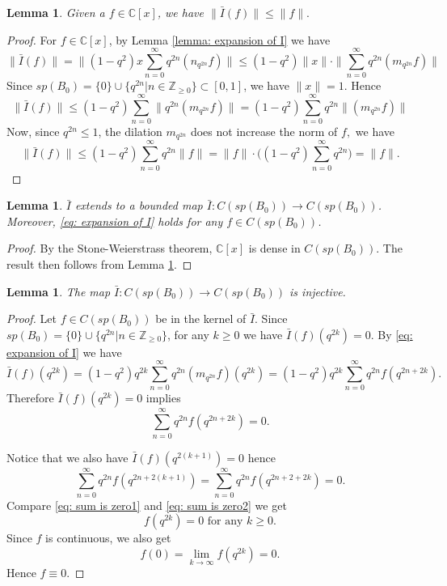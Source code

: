 \documentclass[12pt]{article}
\newtheorem{lemma}[definition]{Lemma}
\numberwithin{equation}{section}
\def\Z{{\mathbb Z}}
\def\C{{\mathbb C}}
\def\I{\bar{I}}
\begin{document}
\begin{lemma}\label{lemma: bound of I}
    Given a $f \in \C[x]$, we have $\|\I(f)\| \leq \|f\|.$
\end{lemma}
\begin{proof}
   For $f\in \C[x]$, by Lemma \ref{lemma: expansion of I} we have  \[
    \|\I(f)\| = \|(1-q^2) x \sum_{n=0}^\infty q^{2n}(n_{q^{2n}} f) \| \leq   (1-q^2) \| x \|\cdot  \|  \sum_{n=0}^\infty q^{2n}(m_{q^{2n}} f) \| 
    \]
    Since $sp(B_0)=\{0\} \cup \{q^{2n} | n \in \Z_{\geq 0} \}\subset [0,1]$, we have $\|x\| = 1$. Hence \[
    \|\I(f)\| \leq  (1-q^2)  \sum_{n=0}^\infty \|   q^{2n}(m_{q^{2n}} f) \| = (1-q^2)  \sum_{n=0}^\infty q^{2n} \| (m_{q^{2n}} f) \|
    \]
    Now, since $q^{2n}\leq 1$, the dilation $m_{q^{2n}}$ does not increase the norm of $f,$ we have \[
    \|\I(f)\| \leq  (1-q^2)  \sum_{n=0}^\infty q^{2n} \| f \| = \|f\| \cdot \Big( (1-q^2)  \sum_{n=0}^\infty q^{2n} \Big) = \|f\|.
    \] 
\end{proof}


\begin{lemma}\label{lemma: I extend to C(spB0)}
    $\I$ extends to a  bounded map $\I: C(sp(B_0)) \to C(sp(B_0))$. Moreover, \eqref{eq: expansion of I} holds for any $f\in C(sp(B_0))$.
\end{lemma}
\begin{proof}
    By the Stone-Weierstrass theorem, $\C[x]$ is dense in $C(sp(B_0))$. The result then follows from Lemma \ref{lemma: bound of I}.
\end{proof}

\begin{lemma}\label{lemma: I injective}
   The map $\I: C(sp(B_0)) \to C(sp(B_0))$ is injective.
\end{lemma}
\begin{proof}
Let $f\in C(sp(B_0))$ be in the kernel of $\I$. Since $sp(B_0)=\{0\} \cup \{q^{2n} | n \in \Z_{\geq 0} \}$, for any $k\geq 0$ we have $\I(f)(q^{2k})=0$. By \eqref{eq: expansion of I} we have
$$
\I(f)(q^{2k})=(1-q^2)q^{2k} \sum_{n=0}^{\infty} q^{2n}(m_{q^{2n}}f)(q^{2k})=(1-q^2)q^{2k} \sum_{n=0}^{\infty} q^{2n}f(q^{2n+2k}).
$$
Therefore $\I(f)(q^{2k})=0$ implies 
\begin{equation}\label{eq: sum is zero1}
\sum_{n=0}^{\infty} q^{2n}f(q^{2n+2k})=0.
\end{equation}

Notice that we also have $\I(f)(q^{2(k+1)})=0$ hence 
\begin{equation}\label{eq: sum is zero2}\sum_{n=0}^{\infty} q^{2n}f(q^{2n+2(k+1)})=\sum_{n=0}^{\infty} q^{2n}f(q^{2n+2+2k})=0.\end{equation}
Compare \eqref{eq: sum is zero1} and \eqref{eq: sum is zero2} we get
$$f(q^{2k})=0 \text{ for any }k\geq 0.
$$
Since $f$ is continuous, we also get
$$f(0)=\lim_{k\to \infty}f(q^{2k})=0.$$
Hence $f\equiv 0$.
\end{proof}
\end{document}
